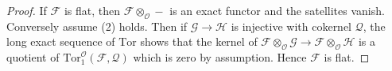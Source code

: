 \documentclass[10pt,a4paper]{amsart}
\theoremstyle{plain}
\theoremstyle{definition}
\theoremstyle{remark}
\numberwithin{equation}{subsection}
\begin{document}
\begin{proof}
If $\mathcal{F}$ is flat, then $\mathcal{F} \otimes_\mathcal{O} -$
is an exact functor and the satellites vanish. Conversely assume (2)
holds. Then if $\mathcal{G} \to \mathcal{H}$ is injective with cokernel
$\mathcal{Q}$, the long exact sequence of $\text{Tor}$ shows that
the kernel of
$\mathcal{F} \otimes_\mathcal{O} \mathcal{G} \to
\mathcal{F} \otimes_\mathcal{O} \mathcal{H}$
is a quotient of
$\text{Tor}_1^\mathcal{O}(\mathcal{F}, \mathcal{Q})$
which is zero by assumption. Hence $\mathcal{F}$ is flat.
\end{proof}
\end{document}
